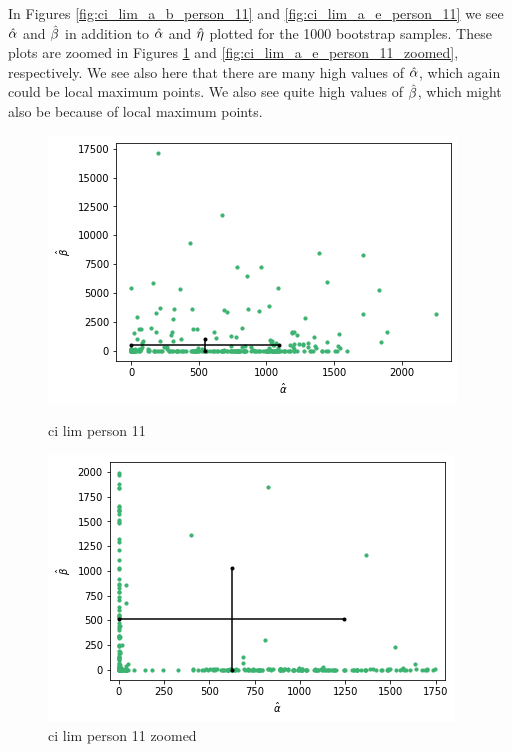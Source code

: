 In Figures \ref{fig:ci_lim_a_b_person_11} and \ref{fig:ci_lim_a_e_person_11} we see $\hat{\alpha}$ and $\hat{\beta}$ in addition to $\hat{\alpha}$ and $\hat{\eta}$ plotted for the 1000 bootstrap samples. These plots are zoomed in Figures \ref{fig:ci_lim_a_b_person_11_zoomed} and \ref{fig:ci_lim_a_e_person_11_zoomed}, respectively. We see also here that there are many high values of $\hat{\alpha}$, which again could be local maximum points. We also see quite high values of $\hat{\beta}$, which might also be because of local maximum points. 
\begin{figure}
    \centering
    \begin{minipage}{0.48\textwidth}
        \centering
        \includegraphics[scale=0.37]{pictures/ci_lim_a_b_person11.png}
        \caption{ci lim person 11}
        \label{fig:ci_lim_a_b_person_11}
    \end{minipage}\hfill
    \begin{minipage}{0.48\textwidth}
        \centering
        \includegraphics[scale=0.37]{pictures/ci_lim_a_b_person11_zoomed.png}
        \caption{ci lim person 11 zoomed}
        \label{fig:ci_lim_a_b_person_11_zoomed}
    \end{minipage}
\end{figure}
